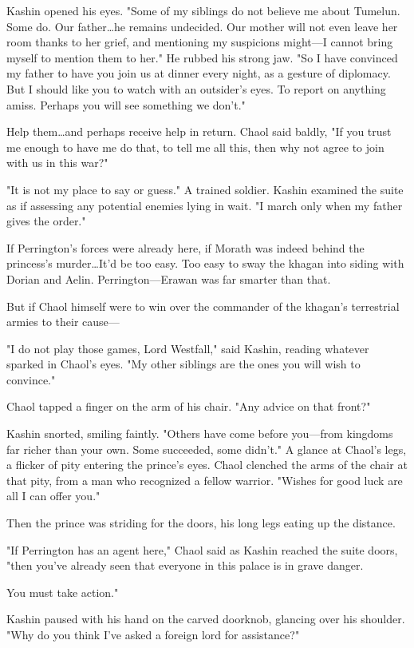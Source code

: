Kashin opened his eyes. "Some of my siblings do not believe me about Tumelun. Some do. Our father\ldots he remains undecided. Our mother will not even leave her room thanks to her grief, and mentioning my suspicions might---I cannot bring myself to mention them to her." He rubbed his strong jaw. "So I have convinced my father to have you join us at dinner every night, as a gesture of diplomacy. But I should like you to watch with an outsider's eyes. To report on anything amiss. Perhaps you will see something we don't."

Help them\ldots and perhaps receive help in return. Chaol said baldly, "If you trust me enough to have me do that, to tell me all this, then why not agree to join with us in this war?"

"It is not my place to say or guess." A trained soldier. Kashin examined the suite as if assessing any potential enemies lying in wait. "I march only when my father gives the order."

If Perrington's forces were already here, if Morath was indeed behind the princess's murder\ldots It'd be too easy. Too easy to sway the khagan into siding with Dorian and Aelin. Perrington---Erawan was far smarter than that.

But if Chaol himself were to win over the commander of the khagan's terrestrial armies to their cause---

"I do not play those games, Lord Westfall," said Kashin, reading whatever sparked in Chaol's eyes. "My other siblings are the ones you will wish to convince."

Chaol tapped a finger on the arm of his chair. "Any advice on that front?"

Kashin snorted, smiling faintly. "Others have come before you---from kingdoms far richer than your own. Some succeeded, some didn't." A glance at Chaol's legs, a flicker of pity entering the prince's eyes. Chaol clenched the arms of the chair at that pity, from a man who recognized a fellow warrior. "Wishes for good luck are all I can offer you."

Then the prince was striding for the doors, his long legs eating up the distance.

"If Perrington has an agent here," Chaol said as Kashin reached the suite doors, "then you've already seen that everyone in this palace is in grave danger.

You must take action."

Kashin paused with his hand on the carved doorknob, glancing over his shoulder. "Why do you think I've asked a foreign lord for assistance?"

